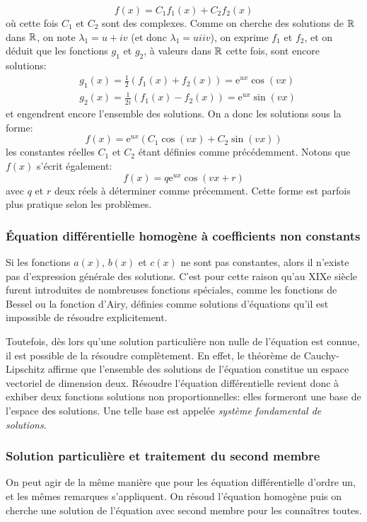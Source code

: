\begin{enumerate}
\begin{equation}
f(x) = C_1f_1(x) + C_2f_2(x)
\end{equation}
où cette fois $C_1$ et $C_2$ sont des complexes. Comme on cherche des solutions de $\mathbb R$ dans $\mathbb R$, on note $\lambda_1 = u + iv$ (et donc $\lambda_1 = u i iv$), on exprime $f_1$ et $f_2$, et on déduit que les fonctions $g_1$ et $g_2$, à valeurs dans $\mathbb R$ cette fois, sont encore solutions:
\begin{align}
&g_1(x) =\frac 12 (f_1(x) + f_2(x) )= \mathrm{e}^{ux}\cos(vx)\\
&g_2(x) = \frac{1}{2i}(f_1(x) - f_2(x)) = \mathrm{e}^{ux}\sin(vx)
\end{align}
et engendrent encore l'ensemble des solutions. On a donc les solutions sous la forme:
\begin{equation}
f(x) = \mathrm{e}^{ux}(C_1\cos(vx) + C_2\sin(vx))
\end{equation}
les constantes réelles $C_1$ et $C_2$ étant définies comme précédemment. Notons que $f(x)$ s'écrit également:
\begin{equation}
f(x) = q \mathrm{e}^{ux}\cos(vx+r)
\end{equation}
avec $q$ et $r$ deux réels à déterminer comme précemment. Cette forme est parfois plus pratique selon les problèmes. 
\end{enumerate}
\subsubsection{Équation différentielle homogène à coefficients non constants} Si les fonctions $a(x)$, $b(x)$ et $c(x)$ ne sont pas constantes, alors il n'existe pas d'expression générale des solutions. C'est pour cette raison qu'au XIXe siècle furent introduites de nombreuses fonctions spéciales, comme les fonctions de Bessel ou la fonction d'Airy, définies comme solutions d'équations qu'il est impossible de résoudre explicitement. 

Toutefois, dès lors qu'une solution particulière non nulle de l'équation est connue, il est possible de la résoudre complètement. En effet, le théorème de Cauchy-Lipschitz affirme que l'ensemble des solutions de l'équation constitue un espace vectoriel de dimension deux. Résoudre l'équation différentielle revient donc à exhiber deux fonctions solutions non proportionnelles: elles formeront une base de l'espace des solutions. Une telle base est appelée \emph{système fondamental de solutions}. 

\subsubsection{Solution particulière et traitement du second membre} On peut agir de la même manière que pour les équation différentielle d'ordre un, et les mêmes remarques s'appliquent. On résoud l'équation homogène puis on cherche une solution de l'équation avec second membre pour les connaîtres toutes. 

